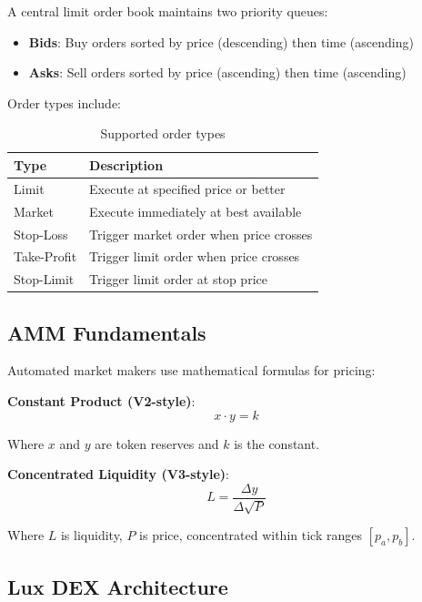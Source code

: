 \documentclass[11pt,twocolumn]{article}
\begin{document}
A central limit order book maintains two priority queues:

\begin{itemize}
\item \textbf{Bids}: Buy orders sorted by price (descending) then time (ascending)
\item \textbf{Asks}: Sell orders sorted by price (ascending) then time (ascending)
\end{itemize}

Order types include:

\begin{table}[h]
\centering
\caption{Supported order types}
\begin{tabular}{@{}ll@{}}
\toprule
Type & Description \\
\midrule
Limit & Execute at specified price or better \\
Market & Execute immediately at best available \\
Stop-Loss & Trigger market order when price crosses \\
Take-Profit & Trigger limit order when price crosses \\
Stop-Limit & Trigger limit order at stop price \\
\bottomrule
\end{tabular}
\label{tab:order-types}
\end{table}

\subsection{AMM Fundamentals}

Automated market makers use mathematical formulas for pricing:

\textbf{Constant Product (V2-style)}:
\begin{equation}
x \cdot y = k
\end{equation}

Where $x$ and $y$ are token reserves and $k$ is the constant.

\textbf{Concentrated Liquidity (V3-style)}:
\begin{equation}
L = \frac{\Delta y}{\Delta \sqrt{P}}
\end{equation}

Where $L$ is liquidity, $P$ is price, concentrated within tick ranges $[p_a, p_b]$.

\subsection{Lux DEX Architecture}
\end{document}
